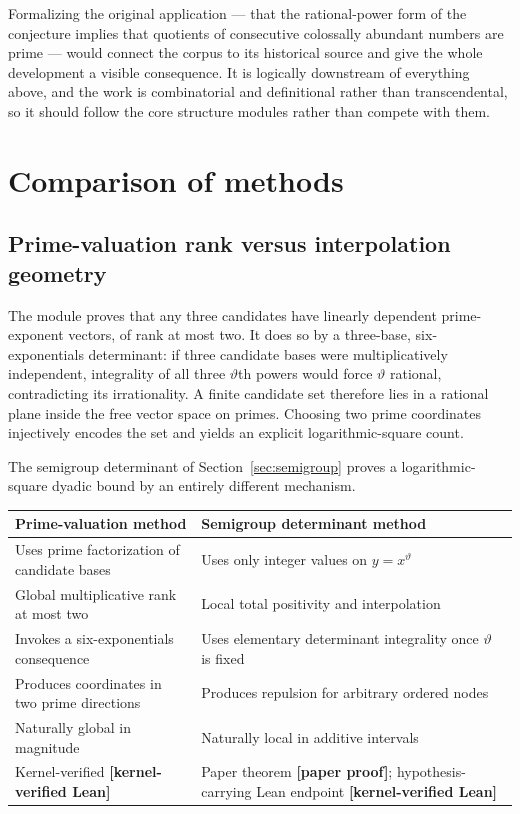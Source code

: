 \documentclass[11pt,oneside]{article}
\theoremstyle{definition}
\theoremstyle{remark}
\newcommand{\thetaq}{\vartheta}
\newcommand{\lean}[1]{\texttt{\detokenize{#1}}}
\newcommand{\statuslean}{\textcolor{leanblue}{\textbf{[kernel-verified Lean]}}}
\newcommand{\statusnew}{\textcolor{newgreen}{\textbf{[paper proof]}}}
\begin{document}
Formalizing the original application --- that the rational-power form of the conjecture
implies that quotients of consecutive colossally abundant numbers are prime \cite{AE1944} ---
would connect the corpus to its historical source and give the whole development a visible
consequence.  It is logically downstream of everything above, and the work is combinatorial
and definitional rather than transcendental, so it should follow the core structure modules
rather than compete with them.
\section{Comparison of methods}
\label{sec:comparison}

\subsection{Prime-valuation rank versus interpolation geometry}
\label{bp:rank-vs-geometry}

The module \lean{MultiplicativeRank} proves that any three candidates have linearly dependent
prime-exponent vectors, of rank at most two.  It does so by a three-base, six-exponentials
determinant: if three candidate bases were multiplicatively independent, integrality of all
three $\thetaq$th powers would force $\thetaq$ rational, contradicting its irrationality.  A
finite candidate set therefore lies in a rational plane inside the free vector space on
primes.  Choosing two prime coordinates injectively encodes the set and yields an explicit
logarithmic-square count.

The semigroup determinant of Section~\ref{sec:semigroup} proves a logarithmic-square dyadic
bound by an entirely different mechanism.

\begin{center}
\begin{tabular}{p{}p{}}
\toprule
Prime-valuation method & Semigroup determinant method \\
\midrule
Uses prime factorization of candidate bases & Uses only integer values on $y=x^{\thetaq}$ \\
Global multiplicative rank at most two & Local total positivity and interpolation \\
Invokes a six-exponentials consequence & Uses elementary determinant integrality once
$\thetaq$ is fixed \\
Produces coordinates in two prime directions & Produces repulsion for arbitrary ordered
nodes \\
Naturally global in magnitude & Naturally local in additive intervals \\
Kernel-verified \statuslean{} & Paper theorem \statusnew{}; hypothesis-carrying Lean endpoint
\statuslean{} \\
\bottomrule
\end{tabular}
\end{center}
\end{document}
